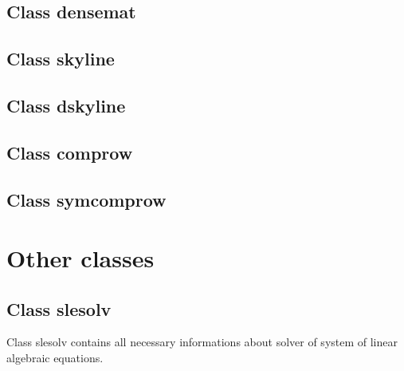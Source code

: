 \section{Class {\sf densemat}}
\label{sectclassdensemat}

\section{Class {\sf skyline}}
\label{sectclassskyline}

\section{Class {\sf dskyline}}
\label{sectclassdskyline}

\section{Class {\sf comprow}}
\label{sectclasscomprow}

\section{Class {\sf symcomprow}}
\label{sectclasssymcomprow}

\chapter{Other classes}

\section{Class {\sf slesolv}}
Class {\sf slesolv} contains all necessary informations about solver of
system of linear algebraic equations.

